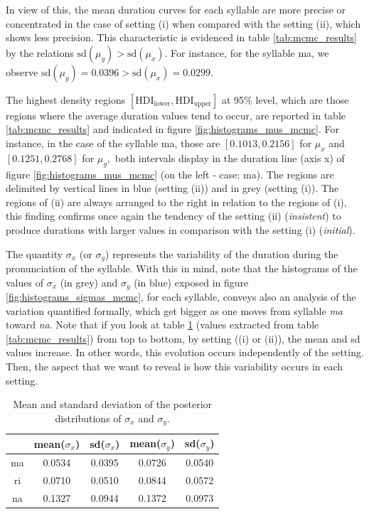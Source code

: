 \documentclass[11pt]{article}
\begin{document}
In view of this, the mean duration curves for each syllable are more precise or concentrated in the case of setting (i) when compared with the setting (ii), which shows less precision. This characteristic is evidenced in table \ref{tab:mcmc_results} by the relations $\text{sd}(\mu_y)> \text{sd}(\mu_x)$. For instance, for the syllable ma, we observe $\text{sd}(\mu_y)=0.0396>\text{sd}(\mu_x)=0.0299$.

The highest density regions $[\mbox{HDI}_{\mbox{lower}},\mbox{HDI}_{\mbox{upper}}]$ at 95\% level, which are those regions where the average duration values tend to occur, are reported in table \ref{tab:mcmc_results} and indicated in figure \ref{fig:histograms_mus_mcmc}. For instance, in the case of the syllable ma, those are $[0.1013,0.2156]$ for $\mu_x$ and $[0.1251,0.2768]$ for $\mu_y,$ both intervals display in the duration line (axis x) of figure \ref{fig:histograms_mus_mcmc} (on the left - case: ma).  The regions are delimited by vertical lines in blue (setting (ii)) and in grey (setting (i)). The regions of (ii) are always arranged to the right in relation to the regions of (i), this finding confirms once again the tendency of the setting (ii) ({\it{insistent}}) to produce durations with larger values in comparison with the setting (i) ({\it{initial}}).

The quantity $\sigma_x$ (or $\sigma_y$) represents the variability of the duration during the pronunciation of the syllable. With this in mind, note that the histograms of the values of $\sigma_x$ (in grey) and $\sigma_y$ (in blue) exposed in figure \ref{fig:histograms_sigmas_mcmc}, for each syllable, conveys also an analysis of the variation quantified formally, which get bigger as one moves from syllable \textit{ma} toward \textit{na}. Note that if you look at table \ref{tab:meanandsd} (values extracted from table \ref{tab:mcmc_results}) from top to bottom, by setting ((i) or (ii)), the mean and sd values increase. In other words, this evolution occurs independently of the setting. Then, the aspect that we want to reveal is how this variability occurs in each setting. 

\begin{table}[h!]
    \centering
     \caption{Mean and standard deviation of the posterior distributions of $\sigma_x$ and $\sigma_y.$}
    \label{tab:meanandsd}
    \begin{tabular}{c|cc||cc}
    & mean($\sigma_x$) & sd($\sigma_x$) & mean($\sigma_y$) & sd($\sigma_y$)\\ \hline
        ma & 0.0534 & 0.0395 &0.0726 & 0.0540 \\
        ri & 0.0710 & 0.0510 &0.0844 & 0.0572 \\
        na & 0.1327 & 0.0944 & 0.1372 & 0.0973
    \end{tabular}
\end{table}
\end{document}
